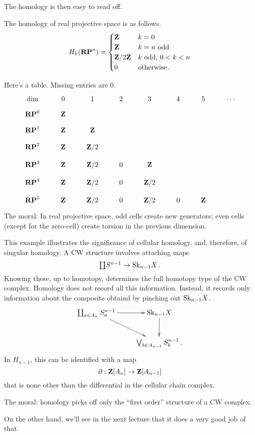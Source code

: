 The homology is then easy to read off.
\begin{prop}
The homology of real projective space is as follows.
\begin{equation*}
 H_k(\mathbf{RP}^n)=\begin{cases}
\mathbf Z & k=0\\
\mathbf Z & k=n\text{ odd}\\
\mathbf Z/2\mathbf Z & k\text{ odd, }0<k<n\\
0 & \text{otherwise}\,.
\end{cases}
\end{equation*}
\end{prop}
Here's a table. Missing entries are $0$.
\[
\xymatrix@R=8pt{
\text{dim} & 0 & 1 & 2 & 3 & 4 & 5 & \cdots \\
\RP^0 & \ZZ \\
\RP^1 & \ZZ & \ZZ \\
\RP^2 & \ZZ & \ZZ/2 \\
\RP^3 & \ZZ & \ZZ/2 & 0 & \ZZ \\
\RP^4 & \ZZ & \ZZ/2 & 0 & \ZZ/2 \\
\RP^5 & \ZZ & \ZZ/2 & 0 & \ZZ/2 & 0 & \ZZ 
}\]
The moral: In real projective space, 
odd cells create new generators; even cells (except for the zero-cell) create
torsion in the previous dimension. 

This example illustrates the significance of cellular homology, and, therefore,
of singular homology. A CW structure involves attaching maps 
\[
\textstyle{\coprod}S^{n-1}\to\mathrm{Sk}_{n-1} X\,.
\]
Knowing these, up to homotopy, determines the full homotopy type of the CW 
complex. Homology does not record all this information. Instead, it records 
only information about the composite obtaind by pinching out $\mathrm{Sk}_{n-1}X$.
\[
\xymatrix{ 
\coprod_{a\in A_n} S^{n-1}_a \ar[r] \ar[dr] & \Sk_{n-1} X \ar[d] \\
& \bigvee_{b\in A_{n-1}} S^{n-1}_b\,.
}\]
In $H_{n-1}$, this can be identified with a map
\[
\partial:\mathbf Z[A_n]\to\mathbf Z[A_{n-1}]
\]
that is none other than the differential in the cellular chain complex.

The moral: homology picks off only the ``first order'' structure of a CW 
complex. 

On the other hand, we'll see in the next lecture that it does a very good job
of that. 


